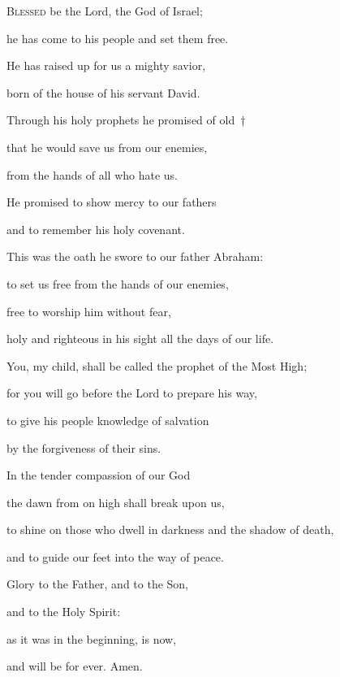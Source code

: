 \lettrine[loversize=0.15,lines=2]{B}{lessed} be the Lord, the God of Israel; ~\GreStar{}~\nopagebreak

\hspace{2pt} he has come to his people and set them free.

\noindent He has raised up for us a mighty savior,~\GreStar{}~\nopagebreak

born of the house of his servant David.

\noindent Through his holy prophets he promised of old~†~\nopagebreak

  that he would save us from our enemies,~\GreStar{}~\nopagebreak

  from the hands of all who hate us.

\noindent He promised to show mercy to our fathers~\GreStar{}~\nopagebreak


and to remember his holy covenant.

\noindent This was the oath he swore to our father Abraham:~\GreStar{}~\nopagebreak

to set us free from the hands of our enemies,

\noindent free to worship him without fear,~\GreStar{}~\nopagebreak

holy and righteous in his sight all the days of our life.

\noindent You, my child, shall be called the prophet of the Most High;~\GreStar{}~\nopagebreak

for you will go before the Lord to prepare his way,

\noindent to give his people knowledge of salvation~\GreStar{}~\nopagebreak


by the forgiveness of their sins.

\noindent In the tender compassion of our God~\GreStar{}~\nopagebreak


the dawn from on high shall break upon us,

\noindent to shine on those who dwell in darkness and the shadow of death,~\GreStar{}~\nopagebreak

and to guide our feet into the way of peace.

\noindent Glory to the Father, and to the Son,~\GreStar{}~\nopagebreak

and to the Holy Spirit:

\noindent as it was in the beginning, is now,~\GreStar{}~\nopagebreak

and will be for ever. Amen.
